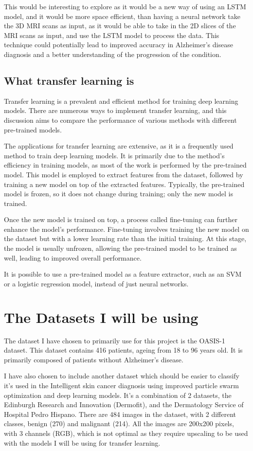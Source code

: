 \documentclass[]{final_report}
\begin{document}
This would be interesting to explore as it would be a new way of using an LSTM model, and it would be more space efficient, than having a neural network take the 3D MRI scans as input, as it would be able to take in the 2D slices of the MRI scans as input, and use the LSTM model to process the data. 
This technique could potentially lead to improved accuracy in Alzheimer's disease diagnosis and a better understanding of the progression of the condition.

\section{What transfer learning is}
Transfer learning is a prevalent and efficient method for training deep learning models. There are numerous ways to implement transfer learning, and this discussion aims to compare the performance of various methods with different pre-trained models.

The applications for transfer learning are extensive, as it is a frequently used method to train deep learning models. It is primarily due to the method's efficiency in training models, as most of the work is performed by the pre-trained model. This model is employed to extract features from the dataset, followed by training a new model on top of the extracted features. Typically, the pre-trained model is frozen, so it does not change during training; only the new model is trained.

Once the new model is trained on top, a process called fine-tuning can further enhance the model's performance. Fine-tuning involves training the new model on the dataset but with a lower learning rate than the initial training. At this stage, the model is usually unfrozen, allowing the pre-trained model to be trained as well, leading to improved overall performance.

It is possible to use a pre-trained model as a feature extractor, such as an SVM or a logistic regression model, instead of just neural networks.

\chapter{The Datasets I will be using}
The dataset I have chosen to primarily use for this project is the OASIS-1\cite{OASIS} dataset.
This dataset contains 416 patients, ageing from 18 to 96 years old. It is primarily composed of patients without Alzheimer's disease.

I have also chosen to include another dataset which should be easier to classify it's used in the Intelligent skin cancer\cite{TAN2019105725} diagnosis using improved particle swarm optimization and deep learning models\cite{TAN2019105725}.
It's a combination of 2 datasets, the Edinburgh Research and Innovation (Dermofit)\cite{Ballerini2013}, and the Dermatology Service of Hospital Pedro Hispano\cite{6610779}. There are 484 images in the dataset, with 2 different classes, benign (270) and malignant (214). All the images are 200x200 pixels, with 3 channels (RGB), which is not optimal as they require upscaling to be used with the models I will be using for transfer learning.
\end{document}
